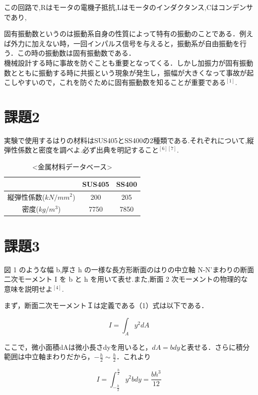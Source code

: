 \documentclass[twocolumn,xelatex,ja=standard,jafont=noto]{bxjsarticle}
\begin{document}
この回路で,Rはモータの電機子抵抗,Lはモータのインダクタンス,Cはコンデンサであり,

固有振動数というのは振動系自身の性質によって特有の振動のことである．例えば外力に加えない時，一回インパルス信号を与えると，振動系が自由振動を行う．この時の振動数は固有振動数である．\\


機械設計する時に事故を防ぐことも重要となってくる．しかし加振力が固有振動数とともに振動する時に共振という現象が発生し，振幅が大きくなって事故が起こしやすいので，これを防ぐために固有振動数を知ることが重要である$　^{[1]}　$.



\section{課題2}

実験で使用するはりの材料はSUS405とSS400の2種類である.それぞれについて,縦弾性係数と密度を調べよ.必ず出典を明記すること$ ^{[6][7]} $.


\begin{table}[!htbp]
\centering
\caption{<金属材料データベース>}
\begin{tabular}{ccc}
\hline
& SUS405 & SS400 \\
\hline
縦弾性係数($ kN/mm^{2} $)& 200& 205\\
密度($ kg/m^{3} $) & 7750& 7850\\
\hline
\end{tabular}
\end{table}



\section{課題3}

図 1 のような幅 b,厚さ h の一様な長方形断面のはりの中立軸 N-N'まわりの断面二次モーメント I を
b と h を用いて表せ.また,断面 2 次モーメントの物理的な意味を説明せよ$ ^{[4]} $.


まず，断面二次モーメントＩは定義である（1）式は以下である．


\begin{equation}
			I=\int_{A}^{}y^{2}dA
\end{equation}


ここで，微小面積dAは微小長さdyを用いると，$ dA=bdy $と表せる．さらに積分範囲は中立軸まわりだから，$ -\frac{h}{2}\sim\frac{h}{2} $．これより

\begin{equation}
			I=\int_{-\frac{h}{2}}^{\frac{h}{2}}y^{2}bdy=\frac{bh^{3}}{12}
\end{equation}
\end{document}
